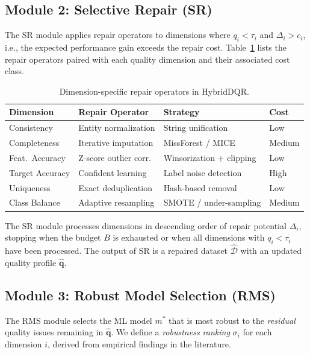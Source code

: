 \documentclass[runningheads]{llncs}
\begin{document}
\subsection{Module 2: Selective Repair (SR)}

The SR module applies repair operators to dimensions where
$q_i < \tau_i$ and $\Delta_i > c_i$, i.e., the expected
performance gain exceeds the repair cost.
Table~\ref{tab:repair-ops} lists the repair operators paired
with each quality dimension and their associated cost class.

\begin{table}[t]
\centering
\caption{Dimension-specific repair operators in HybridDQR.}
\label{tab:repair-ops}
\small
\begin{tabular}{@{}lp{2.4cm}p{3.0cm}l@{}}
\toprule
\textbf{Dimension} & \textbf{Repair Operator} & \textbf{Strategy} & \textbf{Cost} \\
\midrule
Consistency      & Entity normalization        & String unification       & Low    \\
Completeness     & Iterative imputation        & MissForest / MICE        & Medium \\
Feat.\ Accuracy  & Z-score outlier corr.       & Winsorization + clipping & Low    \\
Target Accuracy  & Confident learning          & Label noise detection    & High   \\
Uniqueness       & Exact deduplication         & Hash-based removal       & Low    \\
Class Balance    & Adaptive resampling         & SMOTE / under-sampling   & Medium \\
\bottomrule
\end{tabular}
\end{table}

The SR module processes dimensions in descending order of
repair potential $\Delta_i$, stopping when the budget $B$
is exhausted or when all dimensions with $q_i < \tau_i$
have been processed.
The output of SR is a repaired dataset $\hat{\mathcal{D}}$
with an updated quality profile $\hat{\mathbf{q}}$.

\subsection{Module 3: Robust Model Selection (RMS)}

The RMS module selects the ML model $m^*$ that is most robust
to the \emph{residual} quality issues remaining in $\hat{\mathbf{q}}$.
We define a \emph{robustness ranking} $\sigma_i$ for each dimension
$i$, derived from empirical findings in the literature.
\end{document}
